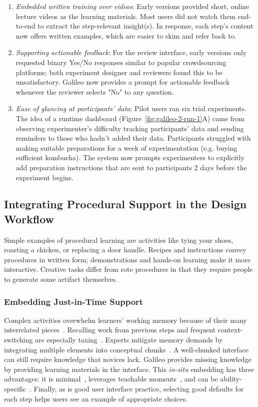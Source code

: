 \begin{enumerate}
\item \textit{Embedded written training over videos}: Early versions provided short, online lecture videos as the learning materials. Most users did not watch them end-to-end to extract the step-relevant insight(s). In response, each step's content now offers written examples, which are easier to skim and refer back to. 

\item \textit{Supporting actionable feedback}: For the review interface, early versions only requested binary Yes/No responses similar to popular crowdsourcing platforms; both experiment designer and reviewers found this to be unsatisfactory. Galileo now provides a prompt for actionable feedback whenever the reviewer selects "No" to any question. 

\item \textit{Ease of glancing at participants' data}: Pilot users ran six trial experiments. The idea of a runtime dashboard (Figure~\ref{fig:galileo-2-run-1}A) came from observing experimenter's difficulty tracking participants' data and sending reminders to those who hadn't added their data. Participants struggled with making suitable preparations for a week of experimentation (e.g. buying sufficient kombucha). The system now prompts experimenters to explicitly add preparation instructions that are sent to participants 2 days before the experiment begins. 
\end{enumerate}

\subsection{Integrating Procedural Support in the Design Workflow}
Simple examples of procedural learning are activities like tying your shoes, roasting a chicken, or replacing a door handle. Recipes and instructions convey procedures in written form; demonstrations and hands-on learning make it more interactive. Creative tasks differ from rote procedures in that they require people to generate some artifact themselves.

\subsubsection{Embedding Just-in-Time Support}
Complex activities overwhelm learners' working memory because of their many interrelated pieces~\cite{Engle2002}. Recalling work from previous steps and frequent context-switching are especially taxing~\cite{Gonzalez2004}. Experts mitigate memory demands by integrating multiple elements into conceptual chunks~\cite{Chase1973}. A well-chunked interface can still require knowledge that novices lack. Galileo provides missing knowledge by providing learning materials in the interface. This \textit{in-situ} embedding has three advantages: it is minimal~\cite{Carroll1987}, leverages teachable moments~\cite{Havighurst1953}, and can be ability-specific~\cite{Corbett1997}. Finally, as is good user interface practice, selecting good defaults for each step helps users see an example of appropriate choices. 

